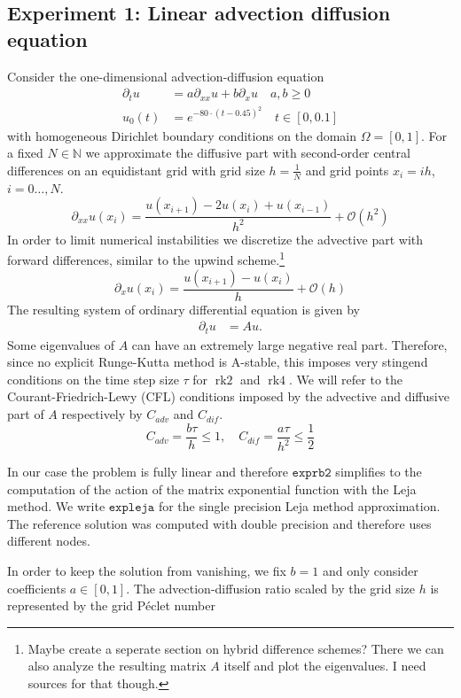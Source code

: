\documentclass{scrartcl}
\begin{document}
	\subsection{Experiment 1: Linear advection diffusion equation}
	Consider the one-dimensional advection-diffusion equation
	\begin{align*}
	\partial_tu &= a\partial_{xx}u + b\partial_xu \quad a,b\ge 0\\
	u_0(t) &= e^{-80\cdot(t-0.45)^2} \quad t\in[0,0.1]
	\end{align*}
	with homogeneous Dirichlet boundary conditions on the domain $\Omega = [0,1]$. 
	For a fixed $N\in\mathbb N$ we approximate the diffusive part with second-order central differences on an equidistant grid with grid size $h = \frac{1}{N}$ and grid points $x_i = ih$, $i=0\dots,N$.
	\[\partial_{xx}u(x_i) = \frac{u(x_{i+1}) - 2u(x_i) + u(x_{i-1})}{{h}^2} + \mathcal{O}({h}^2)\]
	In order to limit numerical instabilities we discretize the advective part with forward differences, similar to the upwind scheme.\footnote{Maybe create a seperate section on hybrid difference schemes? There we can also analyze the resulting matrix $A$ itself and plot the eigenvalues. I need sources for that though.}
	\[\partial_{x}u(x_i) = \frac{u(x_{i+1}) - u(x_i)}{h} + \mathcal{O}(h)\]
	The resulting system of ordinary differential equation is given by
	\begin{align*}
	\partial_tu &= Au.
	\end{align*} 
	Some eigenvalues of $A$ can have an extremely large negative real part. Therefore, since no explicit Runge-Kutta method is A-stable, this imposes very stingend conditions on the time step size $\tau$ for $\operatorname{rk2}$ and $\operatorname{rk4}$. We will refer to the Courant-Friedrich-Lewy (CFL) conditions imposed by the advective and diffusive part of $A$ respectively by $C_{adv}$ and $C_{dif}$.  
	\[ C_{adv} = \frac{b\tau}{h} \le 1, \quad C_{dif} = \frac{a\tau}{h^2} \le \frac{1}{2}\] 
	
	
	
	In our case the problem is fully linear and therefore $\texttt{exprb2}$ simplifies to the computation of the action of the matrix exponential function with the Leja method. We write $\texttt{expleja}$ for the single precision Leja method approximation. The reference solution was computed with double precision and therefore uses different nodes.
	
	In order to keep the solution from vanishing, we fix $b = 1$ and only consider coefficients $a\in[0,1]$. The advection-diffusion ratio scaled by the grid size $h$ is represented by the grid P\'eclet number
	
\end{document}
